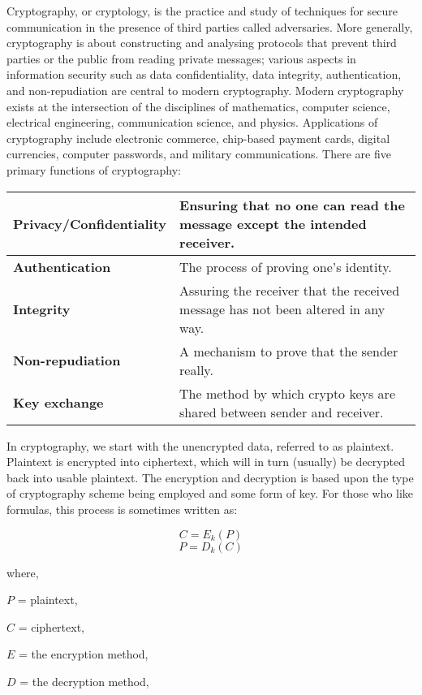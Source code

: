 \documentclass[10pt,british]{article}
\providecommand{\tabularnewline}{\\}
\begin{document}
Cryptography, or cryptology, is the practice and study of techniques
for secure communication in the presence of third parties called adversaries.
More generally, cryptography is about constructing and analysing protocols
that prevent third parties or the public from reading private messages;
various aspects in information security such as data confidentiality,
data integrity, authentication, and non-repudiation are central to
modern cryptography. Modern cryptography exists at the intersection
of the disciplines of mathematics, computer science, electrical engineering,
communication science, and physics. Applications of cryptography include
electronic commerce, chip-based payment cards, digital currencies,
computer passwords, and military communications. There are five primary
functions of cryptography:
\begin{center}
\begin{tabular}{|l||l|}
\hline 
\textbf{\small{}Privacy/Confidentiality} & {\small{}Ensuring that no one can read the message except the intended
receiver.}\tabularnewline
\hline 
\textbf{\small{}Authentication} & {\small{}The process of proving one's identity.}\tabularnewline
\hline 
\textbf{\small{}Integrity} & {\small{}Assuring the receiver that the received message has not been
altered in any way.}\tabularnewline
\hline 
\textbf{\small{}Non-repudiation} & {\small{}A mechanism to prove that the sender really.}\tabularnewline
\hline 
\textbf{\small{}Key exchange} & {\small{}The method by which crypto keys are shared between sender
and receiver.}\tabularnewline
\hline 
\end{tabular}
\par\end{center}

\medskip{}

In cryptography, we start with the unencrypted data, referred to as
plaintext. Plaintext is encrypted into ciphertext, which will in turn
(usually) be decrypted back into usable plaintext. The encryption
and decryption is based upon the type of cryptography scheme being
employed and some form of key. For those who like formulas, this process
is sometimes written as:

$$ C = E_k(P) $$
$$ P = D_k(C) $$

where, 

$P$ = plaintext,

$C$ = ciphertext,

$E$ = the encryption method,

$D$ = the decryption method,
\end{document}
